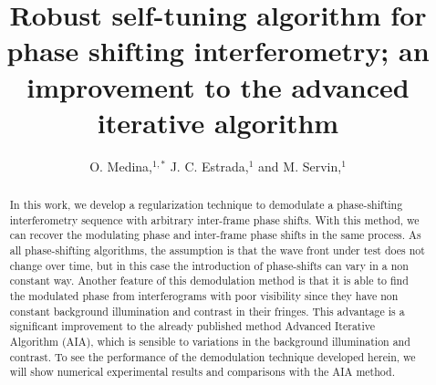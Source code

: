 \documentclass[letterpaper,12pt]{article}   %
\begin{document}
\title{Robust self-tuning algorithm for phase shifting interferometry; an improvement 
to the advanced iterative algorithm}

\author{O. Medina,$^{1,*}$ J. C. Estrada,$^{1}$ and M. Servin,$^{1}$}

\address{$^1$Centro de Investigaciones en Optica A. C., Loma del bosque 115, Col. Lomas 
del Campestre, Leon Guanajuato, 37150, Mexico}

\address{$^*$Corresponding author: orlandomedina@cio.mx}

\maketitle

\begin{abstract}
In this work, we develop a regularization technique to demodulate a  phase-shifting 
interferometry sequence with arbitrary inter-frame phase shifts. With this method, 
we can recover the modulating phase and inter-frame phase shifts in the same process. 
As all phase-shifting algorithms, the assumption is that the wave front under test does 
not change over time, but in this case the introduction of phase-shifts can vary in a 
non constant way. Another feature of this demodulation method is that it is able to find 
the modulated phase from interferograms with poor visibility since they have non 
constant background illumination and contrast in their fringes. This advantage is a 
significant improvement to the already published method Advanced Iterative Algorithm (AIA), 
which is sensible to variations in the background illumination and contrast. To see the 
performance of the demodulation technique developed herein, we will show numerical 
experimental results and comparisons with the AIA method.
\end{abstract}
\end{document}
